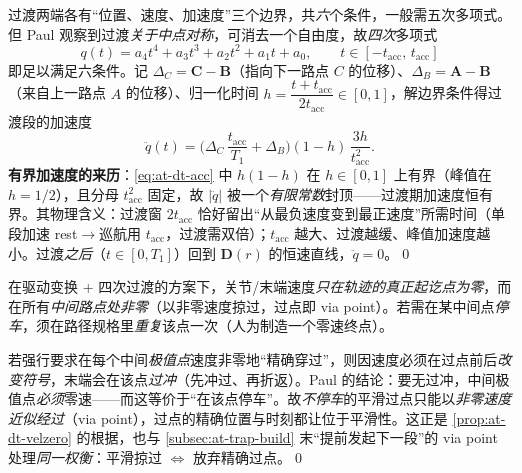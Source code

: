 \begin{derivation}\label{der:at-dt-quartic}
过渡两端各有“位置、速度、加速度”三个边界，共\emph{六}个条件，一般需五次多项式。但 Paul 观察到过渡\emph{关于中点对称}，可消去一个自由度，故\emph{四次}多项式
\begin{equation}
  q(t)=a_4 t^4+a_3 t^3+a_2 t^2+a_1 t+a_0,\qquad t\in[-t_{\mathrm{acc}},\,t_{\mathrm{acc}}]
  \label{eq:at-dt-quartic}
\end{equation}
即足以满足六条件。记 $\Delta_C=\mathbf C-\mathbf B$（指向下一路点 $C$ 的位移）、$\Delta_B=\mathbf A-\mathbf B$（来自上一路点 $A$ 的位移）、归一化时间 $h=\dfrac{t+t_{\mathrm{acc}}}{2t_{\mathrm{acc}}}\in[0,1]$，解边界条件得过渡段的加速度
\begin{equation}
  \ddot q(t)=\Big(\Delta_C\,\frac{t_{\mathrm{acc}}}{T_1}+\Delta_B\Big)(1-h)\,\frac{3h}{t_{\mathrm{acc}}^2}.
  \label{eq:at-dt-acc}
\end{equation}
\textbf{有界加速度的来历}：\cref{eq:at-dt-acc} 中 $h(1-h)$ 在 $h\in[0,1]$ 上有界（峰值在 $h=1/2$），且分母 $t_{\mathrm{acc}}^2$ 固定，故 $|\ddot q|$ 被一个\emph{有限常数}封顶——过渡期加速度恒有界。其物理含义：过渡窗 $2t_{\mathrm{acc}}$ 恰好留出“从最负速度变到最正速度”所需时间（单段加速 rest$\to$巡航用 $t_{\mathrm{acc}}$，过渡需双倍）；$t_{\mathrm{acc}}$ 越大、过渡越缓、峰值加速度越小。过渡\emph{之后}（$t\in[0,T_1]$）回到 $\mathbf D(r)$ 的恒速直线，$\ddot q=0$。\qed
\end{derivation}

\begin{proposition}[速度仅在终点为零]\label{prop:at-dt-velzero}
在驱动变换 + 四次过渡的方案下，关节/末端速度\emph{只在轨迹的真正起讫点为零}，而在所有\emph{中间路点处非零}（以非零速度掠过，过点即 via point）。若需在某中间点\emph{停车}，须在路径规格里\emph{重复}该点一次（人为制造一个零速终点）。
\end{proposition}

\begin{derivation}\label{der:at-dt-overshoot}
若强行要求在每个中间\emph{极值点}速度非零地“精确穿过”，则因速度必须在过点前后\emph{改变符号}，末端会在该点\emph{过冲}（先冲过、再折返）\cite{paul1981robot}。Paul 的结论：要无过冲，中间极值点\emph{必须}零速——而这等价于“在该点停车”。故\emph{不停车}的平滑过点只能以\emph{非零速度近似经过}（via point），过点的精确位置与时刻都让位于平滑性。这正是 \cref{prop:at-dt-velzero} 的根据，也与 \cref{subsec:at-trap-build} 末“提前发起下一段”的 via point 处理\emph{同一权衡}：平滑掠过 $\Leftrightarrow$ 放弃精确过点。\qed
\end{derivation}

